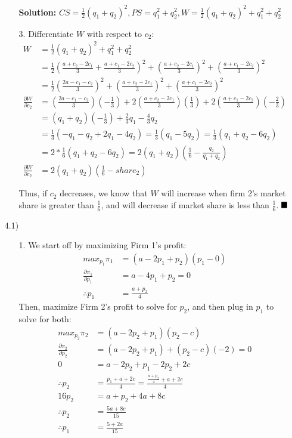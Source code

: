 \documentclass[12pt,letterpaper]{article}
\newcommand{\qed}{\rule{7pt}{7pt}}
\begin{document}
\begin{enumerate}
\begin{enumerate}
    {\color{blue} \textbf{Solution:} $CS = \frac{1}{2}(q_1 + q_2)^2, PS = q_1^2 + q_2^2, W = \frac{1}{2}(q_1 + q_2)^2 + q_1^2 + q_2^2$}
    \item[3.] Differentiate $W$ with respect to $c_2$:
    \begin{align*}
        W &= \frac{1}{2}(q_1 + q_2)^2 + q_1^2 + q_2^2 \\
        &= \frac{1}{2}(\frac{a + c_2 - 2c_1}{3} + \frac{a + c_1 - 2c_2}{3})^2 + (\frac{a + c_2 - 2c_1}{3})^2 + (\frac{a + c_1 - 2c_2}{3})^2 \\
        &= \frac{1}{2}(\frac{2a - c_1 - c_2}{3})^2 + (\frac{a + c_2 - 2c_1}{3})^2 + (\frac{a + c_1 - 2c_2}{3})^2 \\
        \frac{\partial W}{\partial c_2} &= (\frac{2a - c_1 - c_2}{3})(-\frac{1}{3}) + 2(\frac{a + c_2 - 2c_1}{3})(\frac{1}{3}) + 2(\frac{a + c_1 - 2c_2}{3})(-\frac{2}{3}) \\
        &= (q_1 + q_2)(-\frac{1}{3}) + \frac{2}{3}q_1 - \frac{4}{3}q_2 \\
        &= \frac{1}{3} (-q_1 - q_2 + 2q_1 - 4q_2) = \frac{1}{3}(q_1 - 5q_2) = \frac{1}{3} (q_1 + q_2 - 6q_2) \\
        &= 2 * \frac{1}{6} (q_1 + q_2 - 6q_2) = 2 (q_1 + q_2)(\frac{1}{6} - \frac{q_2}{q_1 + q_2}) \\
        \frac{\partial W}{\partial c_2} &= 2 (q_1 + q_2)(\frac{1}{6} - share_2)
    \end{align*} 

    Thus, if $c_2$ decreases, we know that $W$ will increase when firm 2's market share is greater than $\frac{1}{6}$, and will decrease if market share is less than $\frac{1}{6}$. $\qed$
\end{enumerate} 

\item[4.1)]
\begin{enumerate}
    \item[1.] We start off by maximizing Firm 1's profit:
    \begin{align*}
        max_{p_1} \pi_1 &= (a-2p_1 + p_2)(p_1 - 0) \\
        \frac{\partial \pi_1}{\partial p_1} &= a - 4p_1 + p_2 = 0 \\
        \therefore p_1 &= \frac{a + p_2}{4}
    \end{align*} 
    Then, maximize Firm 2's profit to solve for $p_2$, and then plug in $p_1$ to solve for both:
    \begin{align*}
        max_{p_2} \pi_2 &= (a-2p_2 + p_1)(p_2 - c) \\
        \frac{\partial \pi_2}{\partial p_2} &= (a - 2p_2 + p_1) + (p_2 - c)(-2) = 0 \\
        0 &= a - 2p_2 + p_1 - 2p_2 + 2c \\
        \therefore p_2 &= \frac{p_1 + a + 2c}{4} = \frac{\frac{a + p_2}{4} + a + 2c}{4} \\
        16p_2 &= a + p_2 + 4a + 8c \\
        \therefore p_2 &= \frac{5a + 8c}{15} \\
        \therefore p_1 &= \frac{5 + 2a}{15}
    \end{align*} 


\end{enumerate}
\end{enumerate}
\end{document}
